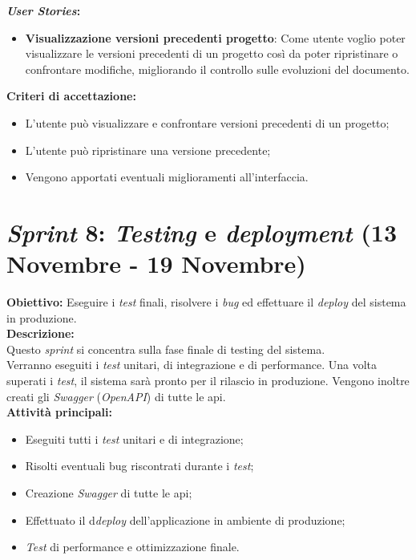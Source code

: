 \noindent \textbf{\textit{User Stories}:} 
\begin{itemize}
    \item \textbf{Visualizzazione versioni precedenti progetto}: Come utente voglio poter visualizzare le versioni precedenti di un progetto così da poter ripristinare o confrontare modifiche, migliorando il controllo sulle evoluzioni del documento.
\end{itemize}

\noindent \textbf{Criteri di accettazione:}  
\begin{itemize}
    \item L'utente può visualizzare e confrontare versioni precedenti di un progetto;
    \item L'utente può ripristinare una versione precedente;
    \item Vengono apportati eventuali miglioramenti all’interfaccia.
\end{itemize}

\section*{\textit{Sprint} 8: \textit{Testing} e \textit{deployment} (13 Novembre - 19 Novembre)}
\textbf{Obiettivo:} Eseguire i \textit{test} finali, risolvere i \textit{bug} ed effettuare il \textit{deploy} del sistema in produzione.\\

\noindent \textbf{Descrizione:}\\
\noindent Questo \textit{sprint} si concentra sulla fase finale di testing del sistema.\\
Verranno eseguiti i \textit{test} unitari, di integrazione e di performance. Una volta superati i \textit{test}, il sistema sarà pronto per il rilascio in produzione. Vengono inoltre creati gli \textit{Swagger} (\textit{OpenAPI}) di tutte le \gls{api}.\\

\noindent \textbf{Attività principali:}
\begin{itemize}
    \item Eseguiti tutti i \textit{test} unitari e di integrazione;
    \item Risolti eventuali bug riscontrati durante i \textit{test};
    \item Creazione \textit{Swagger} di tutte le \gls{api};
    \item Effettuato il d\textit{deploy} dell'applicazione in ambiente di produzione;
    \item \textit{Test} di performance e ottimizzazione finale.
\end{itemize}

